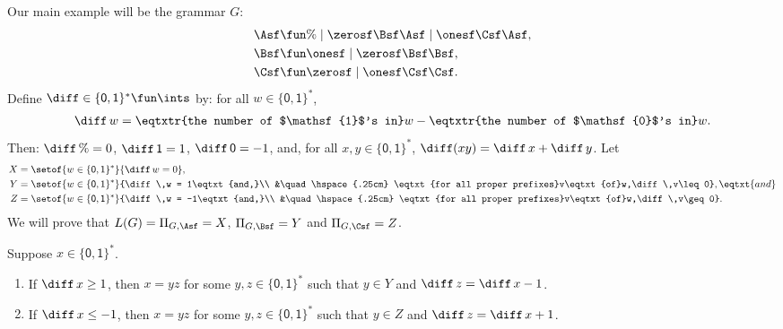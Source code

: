 Our main example will be the grammar $G$:
\begin{align*}
\Asf &\fun \% \mid \zerosf\Bsf\Asf \mid \onesf\Csf\Asf , \\
\Bsf &\fun \onesf \mid \zerosf\Bsf\Bsf , \\
\Csf &\fun \zerosf \mid \onesf\Csf\Csf .
\end{align*}
Define $\diff\in\{\mathsf{0,1}\}^*\fun\ints$ by:
for all $w\in\{\mathsf{0,1}\}^*$,
\begin{gather*}
\diff\,w =
\eqtxtr{the number of $\mathsf{1}$'s in}w -
\eqtxtr{the number of $\mathsf{0}$'s in}w .
\end{gather*}
Then: $\diff\,\% = 0$, $\diff\,\mathsf{1} = 1$, $\diff\,\mathsf{0} =
-1$, and, for all $x,y\in\{\mathsf{0,1}\}^*$, $\diff(xy) = \diff\,x +
\diff\,y$.
Let
\begin{align*}
  X &= \setof{w\in\{\mathsf{0,1}\}^*}{\diff\,w = 0} , \\
  Y &= \setof{w\in\{\mathsf{0,1}\}^*}{\diff\,w = 1\eqtxt{and,}\\
    &\quad\hspace{.25cm}
    \eqtxt{for all proper prefixes}v\eqtxt{of}w,\diff\,v\leq 0} , \eqtxt{and}\\
  Z &= \setof{w\in\{\mathsf{0,1}\}^*}{\diff\,w = -1\eqtxt{and,}\\
    &\quad\hspace{.25cm} \eqtxt{for all proper
      prefixes}v\eqtxt{of}w,\diff\,v\geq 0} .
\end{align*}
We will prove that $L(G) = \Pi_{G,\Asf} = X$, $\Pi_{G,\Bsf} = Y$ and
$\Pi_{G,\Csf} = Z$.

\begin{lemma}
\label{GramCorrLem1}
Suppose $x\in\{\mathsf{0,1}\}^*$.
\begin{enumerate}[\quad(1)]
\item If $\diff\,x\geq 1$, then $x=yz$ for some $y,z\in\{\mathsf{0,1}\}^*$
  such that $y\in Y$ and $\diff\,z = \diff\,x - 1$.

\item If $\diff\,x\leq -1$, then $x=yz$ for some $y,z\in\{\mathsf{0,1}\}^*$
  such that $y\in Z$ and $\diff\,z = \diff\,x + 1$.
\end{enumerate}
\end{lemma}

